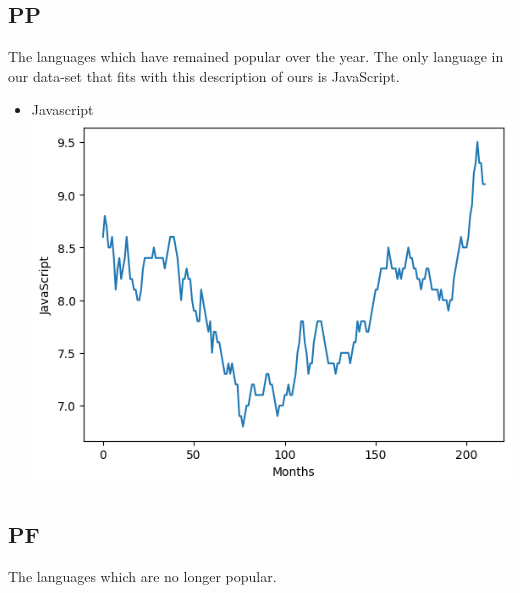 \documentclass[conference]{IEEEtran}
\begin{document}
\subsection{PP}
The languages which have remained popular over the year. The only language in our data-set that fits with this description of ours is JavaScript.
\begin{itemize}
\item{Javascript}
\includegraphics[scale=0.4]{lineplot/javascript.png}
\end{itemize}

\subsection{PF}
The languages which are no longer popular.
\end{document}

